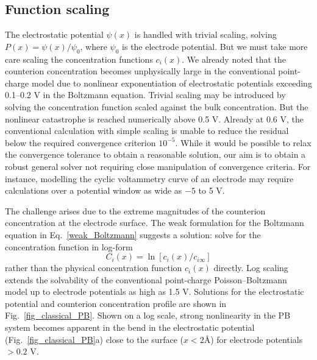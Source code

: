\subsection{Function scaling}
The electrostatic potential $\psi(x)$ is handled with trivial
scaling, solving $P(x)=\psi(x)/\psi_0$, where $\psi_0$ is the
electrode potential.
But we must take more care scaling the concentration functions
$c_i(x)$.
We already noted that the counterion concentration becomes unphysically
large in the conventional point-charge model due to nonlinear
exponentiation of  electrostatic potentials exceeding 0.1--0.2 V in
the Boltzmann equation. Trivial scaling may be introduced by solving
the concentration function scaled against the bulk concentration. But
 the nonlinear catastrophe is reached
numerically above 0.5 V. Already at 0.6 V, the conventional
calculation with simple scaling is unable to reduce the residual below
the required convergence criterion  $10^{-5}$. While it would be possible to relax the
convergence tolerance to obtain a reasonable solution, our aim is to
obtain a robust general solver not requiring close manipulation of
convergence criteria. For instance,  modelling the
cyclic voltammetry curve of an electrode may require calculations
over a potential window as wide as $-5$ to 5 V.

The challenge arises due to the extreme magnitudes of the counterion
concentration at the electrode surface. The weak formulation for the
Boltzmann equation in Eq.~\eqref{weak_Boltzmann} suggests a solution:
solve for the concentration function in log-form
\begin{equation}
C_{i}(x) = \ln[ c_{i}(x) / c_{i\infty}]
\label{log_scaling}
\end{equation}
rather than the physical concentration function $c_{i}(x)$ directly. Log
scaling extends the solvability of the conventional point-charge Poisson--Boltzmann
model up to electrode potentials as high as 1.5 V. Solutions for the
electrostatic potential and counterion concentration profile are shown
in Fig.~\ref{fig_classical_PB}. Shown on a log scale, strong
nonlinearity in the PB system becomes apparent in the bend in the
electrostatic potential (Fig.~\ref{fig_classical_PB}a) close to the
surface ($x<2$\AA) for electrode potentials $> 0.2$ V.

